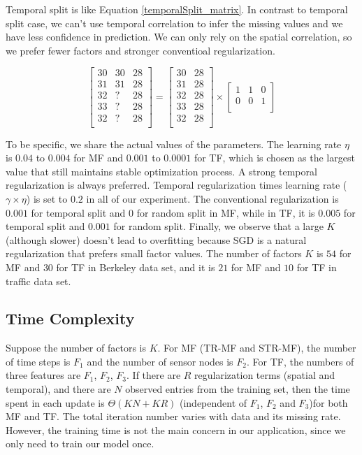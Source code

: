 Temporal split is like Equation \ref{temporalSplit_matrix}.
In contrast to temporal split case, we can't use temporal correlation to infer the missing values and we have less confidence in prediction.
We can only rely on the spatial correlation, so we prefer fewer factors and stronger conventioal regularization.

\begin{equation}
\label{temporalSplit_matrix}
\begin{bmatrix}
30 & 30 & 28\\
31 & 31 & 28\\
32 &  ? & 28\\
33 &  ? & 28\\
32 &  ? & 28\\
\end{bmatrix} 
= 
\begin{bmatrix}
30 & 28\\
31 & 28\\
32 & 28\\
33 & 28\\
32 & 28\\
\end{bmatrix} 
\times
\begin{bmatrix}
1 & 1 & 0\\
0 & 0 & 1\\
\end{bmatrix} 
\end{equation}

To be specific, we share the actual values of the parameters.
The learning rate $\eta$ is $0.04$ to $0.004$ for MF and $0.001$ to $0.0001$ for TF, which is chosen as the largest value that still maintains stable optimization process.
A strong temporal regularization is always preferred.
Temporal regularization times learning rate ($\gamma \times \eta$) is set to $0.2$ in all of our experiment.
The conventional regularization is $0.001$ for temporal split and $0$ for random split in MF, while in TF, it is $0.005$ for temporal split and $0.001$ for random split.
Finally, we observe that a large $K$ (although slower) doesn't lead to overfitting because SGD is a natural regularization that prefers small factor values. 
The number of factors $K$ is $54$ for MF and $30$ for TF in Berkeley data set, and it is $21$ for MF and $10$ for TF in traffic data set. 


\subsection{Time Complexity}
Suppose the number of factors is $K$.
For MF (TR-MF and STR-MF), the number of time steps is $F_1$ and the number of sensor nodes is $F_2$. 
For TF, the numbers of three features are $F_1$, $F_2$, $F_3$.  
If there are $R$ regularization terms (spatial and temporal), and there are $N$ observed entries from the training set, then the time spent in each update is $\Theta(KN + KR)$ (independent of $F_1$, $F_2$ and $F_3$)for both MF and TF. 
The total iteration number varies with data and its missing rate. 
However, the training time is not the main concern in our application, since we only need to train our model once.

